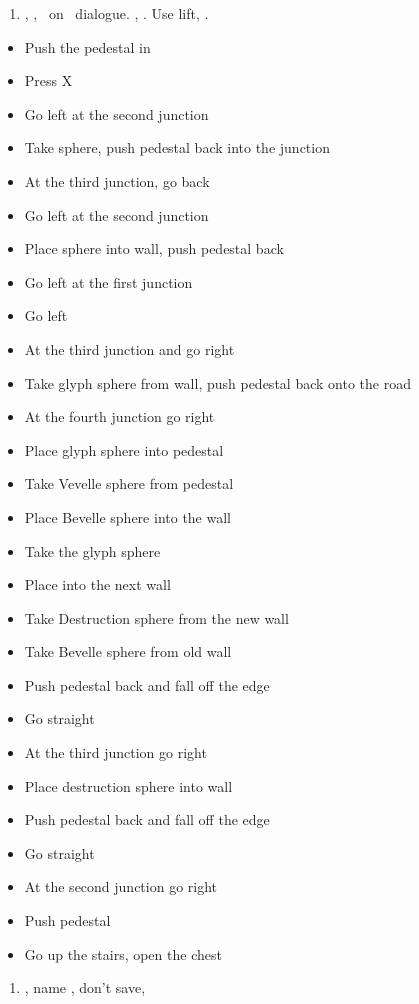 \begin{enumerate}[resume]
	\item \sd, \fmv[1:30], \sd\ on \yuna\ dialogue. \skippablefmv[30], \sd. Use lift, \sd.
\end{enumerate}
\begin{trial}
\begin{itemize}
	\item Push the pedestal in
	\item Press X
	\item Go left at the second junction
	\item Take sphere, push pedestal back into the junction
	\item At the third junction, go back
	\item Go left at the second junction
	\item Place sphere into wall, push pedestal back
	\item Go left at the first junction
	\item Go left
	\item At the third junction and go right
	\item Take glyph sphere from wall, push pedestal back onto the road
	\item At the fourth junction go right
	\item Place glyph sphere into pedestal
	\item Take Vevelle sphere from pedestal
	\item Place Bevelle sphere into the wall
	\item Take the glyph sphere
	\item Place into the next wall
	\item Take Destruction sphere from the new wall %
	\item Take Bevelle sphere from old wall
	\item Push pedestal back and fall off the edge
	\item Go straight
	\item At the third junction go right
	\item Place destruction sphere into wall
	\item Push pedestal back and fall off the edge
	\item Go straight
	\item At the second junction go right
	\item Push pedestal
	\item Go up the stairs, open the chest
\end{itemize}
\end{trial}
\begin{enumerate}[resume]
	\item \sd, name \bahamut, don't save, \sd
\end{enumerate}
